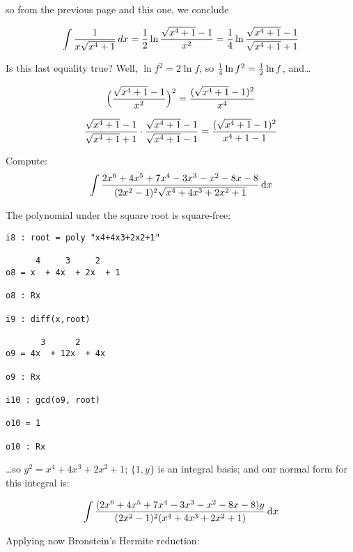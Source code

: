 so from the previous page and this one, we conclude

$$\int {1\over{x\sqrt{x^4+1}}} \, dx
={1\over2} \ln {{\sqrt{x^4+1}-1}\over{x^2}}
={1\over4} \ln {{\sqrt{x^4+1}-1}\over{\sqrt{x^4+1}+1}}$$

Is this last equality true?  Well, $\ln f^2 = 2\ln f$, so
${1\over4}\ln f^2 = {1\over2}\ln f$, and\ldots

$$\Big({{\sqrt{x^4+1}-1}\over{x^2}}\Big)^2
= {{(\sqrt{x^4+1}-1)^2}\over{x^4}}$$

$${{\sqrt{x^4+1}-1}\over{\sqrt{x^4+1}+1}} \cdot
{{\sqrt{x^4+1}-1}\over{\sqrt{x^4+1}-1}}
= {{(\sqrt{x^4+1}-1)^2}\over{x^4+1-1}}$$




\endexample

\vfill\eject
{}

\example Compute:
$$\int {{2x^6+4x^5+7x^4-3x^3-x^2-8x-8}\over{(2x^2-1)^2\sqrt{x^4+4 x^3+2 x^2+1}}} \,{\rm d}x$$

The polynomial under the square root is square-free:

{\small\begin{verbatim}
i8 : root = poly "x4+4x3+2x2+1"

      4     3     2
o8 = x  + 4x  + 2x  + 1

o8 : Rx

i9 : diff(x,root)

       3      2
o9 = 4x  + 12x  + 4x

o9 : Rx

i10 : gcd(o9, root)

o10 = 1

o10 : Rx
\end{verbatim}}

\ldots so $y^2 = x^4+4 x^3+2 x^2+1$; $\{1, y\}$ is an integral basis;
and our normal form for this integral is:

$$\int {{(2x^6+4x^5+7x^4-3x^3-x^2-8x-8)y}\over{(2x^2-1)^2(x^4+4 x^3+2 x^2+1)}} \,{\rm d}x$$

Applying now Bronstein's Hermite reduction:

